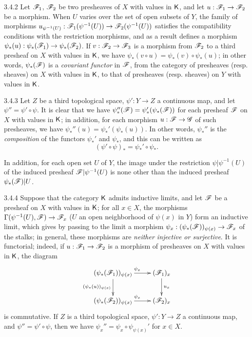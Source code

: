 \begin{env}{3.4.2}
\label{env-0.3.4.2}
Let $\mathscr{F}_1$, $\mathscr{F}_2$ be two presheaves of $X$ with values in $\mathsf{K}$, and let
$u:\mathscr{F}_1\to\mathscr{F}_2$ be a morphism. When $U$ varies over the set of open
subsets of $Y$, the family of morphisms
$u_{\psi^{-1}(U)}:\mathscr{F}_1(\psi^{-1}(U))\to\mathscr{F}_2(\psi^{-1}(U))$ satisfies the
compatibility conditions with the restriction morphisms, and as a result defines
a morphism $\psi_*(u):\psi_*(\mathscr{F}_1)\to\psi_*(\mathscr{F}_2)$. If
$v:\mathscr{F}_2\to\mathscr{F}_3$ is a morphism from $\mathscr{F}_2$ to a third presheaf on $X$
with values in $\mathsf{K}$, we have $\psi_*(v\circ u)=\psi_*(v)\circ\psi_*(u)$; in
other words, $\psi_*(\mathscr{F})$ is a \emph{covariant functor} in $\mathscr{F}$, from
the category of presheaves (resp. sheaves) on $X$ with values in $\mathsf{K}$, to that
of presheaves (resp. sheaves) on $Y$ with values in $\mathsf{K}$.
\end{env}

\begin{env}{3.4.3}
\label{env-0.3.4.3}
Let $Z$ be a third topological space, $\psi':Y\to Z$ a continuous map, and let
$\psi''=\psi'\circ\psi$. It is clear that we have
$\psi_*''(\mathscr{F})=\psi_*'(\psi_*(\mathscr{F}))$ for each presheaf $\mathscr{F}$ on $X$
with values in $\mathsf{K}$; in addition, for each morphism $u:\mathscr{F}\to\mathscr{G}$ of such
presheaves, we have $\psi_*''(u)=\psi_*'(\psi_*(u))$. In other words, $\psi_*''$
is the \emph{composition} of the functors $\psi_*'$ and $\psi_*$, and this can
be written as
\[
  (\psi'\circ\psi)_*=\psi_*'\circ\psi_*.
\]

In addition, for each open set $U$ of $Y$, the image under the restriction
$\psi|\psi^{-1}(U)$ of the induced presheaf $\mathscr{F}|\psi^{-1}(U)$ is none other
than the induced presheaf $\psi_*(\mathscr{F})|U$.
\end{env}

\begin{env}{3.4.4}
\label{env-0.3.4.4}
Suppose that the category $\mathsf{K}$ admits inductive limits, and let $\mathscr{F}$ be a
presheaf on $X$ with values in $\mathsf{K}$; for all $x\in X$, the morphisms
$\Gamma(\psi^{-1}(U),\mathscr{F})\to\mathscr{F}_x$ ($U$ an open neighborhood of $\psi(x)$
in $Y$) form an inductive limit, which gives by passing
to the limit a morphism $\psi_x:(\psi_*(\mathscr{F}))_{\psi(x)}\to\mathscr{F}_x$ of the
stalks; in general, these morphisms are \emph{neither injective or surjective}.
It is functorial; indeed, if $u:\mathscr{F}_1\to\mathscr{F}_2$ is a morphism of presheaves
on $X$ with values in $\mathsf{K}$, the diagram
\[
  \xymatrix{
    (\psi_*(\sh{F}_1))_{\psi(x)}\ar[r]^{\psi_x}\ar[d]_{(\psi_*(u))_{\psi(x)}} &
    (\sh{F}_1)_x\ar[d]^{u_x}\\
    (\psi_*(\sh{F}_2))_{\psi(x)}\ar[r]^{\psi_x} &
    (\sh{F}_2)_x
  }
\]
is commutative. If $Z$ is a third topological space, $\psi':Y\to Z$ a continuous
map, and $\psi''=\psi'\circ\psi$, then we have
$\psi_x''=\psi_x\circ\psi_{\psi(x)}'$ for $x\in X$.
\end{env}


